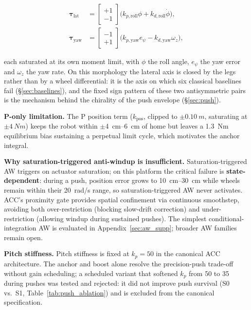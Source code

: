 \documentclass[conference]{IEEEtran}
\begin{document}
\begin{equation}
\begin{aligned}
\boldsymbol{\tau}_{\text{lat}} &=
\begin{bmatrix} +1 \\ -1 \end{bmatrix}
\big(k_{p,\text{roll}}\phi + k_{d,\text{roll}}\dot{\phi}\big),\\[2pt]
\boldsymbol{\tau}_{\text{yaw}} &=
\begin{bmatrix} -1 \\ +1 \end{bmatrix}
\big(k_{p,\text{yaw}}e_\psi - k_{d,\text{yaw}}\omega_z\big),
\end{aligned}
\label{eq:lat_yaw}
\end{equation}

each saturated at its own moment limit, with $\phi$ the roll angle, $e_\psi$ the yaw error and $\omega_z$ the yaw rate. On this morphology the lateral axis is closed by the legs rather than by a wheel differential: it is the axis on which six classical baselines fail (\S\ref{sec:baselines}), and the fixed sign pattern of these two antisymmetric pairs is the mechanism behind the chirality of the push envelope (\S\ref{sec:push}).

\textbf{P-only limitation.}
The P position term ($k_{\text{pos}}$, clipped to $\pm\SI{0.10}{m}$, saturating at $\pm\SI{4}{Nm}$) keeps the robot within $\pm$\SIrange{4}{6}{cm} of home but leaves a \SI{1.3}{Nm} equilibrium bias sustaining a perpetual limit cycle, which motivates the anchor integral.

\textbf{Why saturation-triggered anti-windup is insufficient.}
Saturation-triggered AW triggers on actuator saturation; on this platform the critical failure is \textbf{state-dependent}: during a push, position error grows to \SIrange{10}{30}{cm} while wheels remain within their \SI{20}{rad/s} range, so saturation-triggered AW never activates.
ACC's proximity gate provides spatial confinement via continuous smoothstep, avoiding both over-restriction (blocking slow-drift correction) and under-restriction (allowing windup during sustained pushes).
The simplest conditional-integration AW is evaluated in Appendix~\ref{sec:aw_supp}; broader AW families remain open.

\textbf{Pitch stiffness.}
Pitch stiffness is fixed at $k_p{=}50$ in the canonical ACC architecture. The anchor and boost alone resolve the precision-push trade-off without gain scheduling; a scheduled variant that softened $k_p$ from 50 to 35 during pushes was tested and rejected: it did not improve push survival (S0 vs.\ S1, Table~\ref{tab:push_ablation}) and is excluded from the canonical specification.
\end{document}
